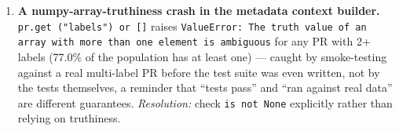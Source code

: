 \documentclass{experimentreport}
\begin{document}
{\begin{enumerate}
\item \textbf{A numpy-array-truthiness crash in the metadata context builder.} \texttt{pr.get
("labels") or []} raises \texttt{ValueError: The truth value of an array with more than one element
is ambiguous} for any PR with 2+ labels (77.0\% of the population has at least one) --- caught by
smoke-testing against a real multi-label PR before the test suite was even written, not by the
tests themselves, a reminder that ``tests pass'' and ``ran against real data'' are different
guarantees. \emph{Resolution:} check \texttt{is not None} explicitly rather than relying on
truthiness.

\end{enumerate}

}

\end{document}
